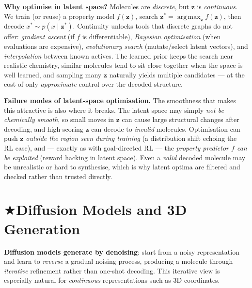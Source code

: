 \documentclass[11pt, oneside]{book}
\makeatletter
\newcommand{\starglyph}{\textcolor{stargold}{\ensuremath{\bigstar}}}
\newcommand{\starsec}[1]{%
  \texorpdfstring{\starglyph\hspace{0.4em}\textcolor{star@frame}{#1}}{#1}}
\newcommand{\argmax}{\operatorname*{arg\,max}}
\newcommand{\zvec}{\mathbf{z}}
\makeatother
\begin{document}
\textbf{Why optimise in latent space?} Molecules are \emph{discrete}, but $\zvec$ is
\emph{continuous}. We train (or reuse) a property model $f(\zvec)$, search
$\zvec^\ast = \argmax_{\zvec} f(\zvec)$, then decode $x^\ast \sim p(x \mid \zvec^\ast)$.
Continuity unlocks tools that discrete graphs do not offer: \emph{gradient ascent}
(if $f$ is differentiable), \emph{Bayesian optimisation} (when evaluations are
expensive), \emph{evolutionary search} (mutate/select latent vectors), and
\emph{interpolation} between known actives. The learned prior keeps the search near
realistic chemistry, similar molecules tend to sit close together when the space is
well learned, and sampling many $\zvec$ naturally yields multiple candidates --- at
the cost of only \emph{approximate} control over the decoded structure.

\noindent\textbf{Failure modes of latent-space optimisation.} The smoothness that makes
this attractive is also where it breaks. The latent space may simply \emph{not be
chemically smooth}, so small moves in $\zvec$ can cause large structural changes after
decoding, and high-scoring $\zvec$ can decode to \emph{invalid} molecules. Optimisation
can push $\zvec$ \emph{outside the region seen during training} (a distribution shift
echoing the RL case), and --- exactly as with goal-directed RL --- the
\emph{property predictor $f$ can be exploited} (reward hacking in latent space). Even a
\emph{valid} decoded molecule may be unrealistic or hard to synthesise, which is why
latent optima are filtered and checked rather than trusted directly.

\vspace{-0.5 cm}

\section{\starsec{Diffusion Models and 3D Generation}}

\textbf{Diffusion models generate by denoising}: start from a noisy representation and
learn to \emph{reverse} a gradual noising process, producing a molecule through
\emph{iterative} refinement rather than one-shot decoding. This iterative view is
especially natural for \emph{continuous} representations such as 3D coordinates.
\end{document}
